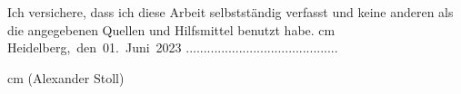 


\cleardoublepage

\def\makeheadline{}

\rule{0cm}{5cm}

\bigskip
\noindent Ich versichere, dass ich diese Arbeit selbstst\"{a}ndig verfasst und keine anderen als die angegebenen Quellen und Hilfsmittel benutzt habe.  cm \noindent
\hbox{Heidelberg, den 01. Juni 2023}\hfill{ 
	...........................................}

 cm (Alexander Stoll)

